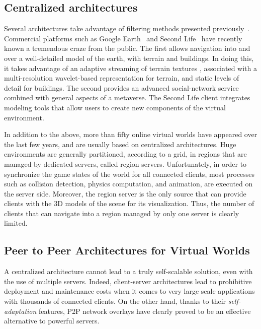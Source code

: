 \subsection{Centralized architectures}
Several architectures take advantage of filtering methods presented
previously~\cite{ring,dive}. Commercial platforms such
as Google Earth~\cite{googleearth} and Second Life~\cite{secondlife}
have recently known a tremendous craze from the public. The first
allows navigation into and over a well-detailed model of the earth,
with terrain and buildings. In doing this, it takes advantage of an
adaptive streaming of terrain textures \cite{tanner}, associated with
a multi-resolution wavelet-based representation for terrain, and
static levels of detail for buildings. The second provides an advanced
social-network service combined with general aspects of a
metaverse. The Second Life client integrates modeling tools that allow
users to create new components of the virtual environment.

In addition to the above, more than fifty online virtual worlds have
appeared over the last few years, and are usually based on centralized
architectures. Huge environments are generally partitioned, according
to a grid, in regions that are managed by dedicated servers, called
region servers. Unfortunately, in order to synchronize the game states
of the world for all connected clients, most processes such as
collision detection, physics computation, and animation, are executed
on the server side. Moreover, the region server is the only source
that can provide clients with the 3D models of the scene  for its
visualization. Thus, the number of clients that can navigate into a
region managed by only one server is clearly limited.

\subsection{Peer to Peer Architectures for Virtual Worlds}
A centralized architecture cannot lead to a truly self-scalable
solution, even with the use of multiple servers. Indeed, client-server
architectures lead to prohibitive deployment and maintenance costs
when it comes to very large scale applications with thousands of
connected clients. On the other hand, thanks to their
\emph{self-adaptation} features, P2P network overlays have clearly
proved to be an effective alternative to powerful servers. 

